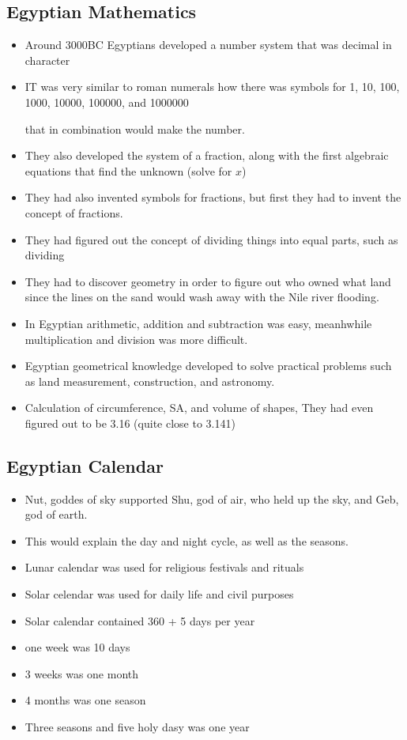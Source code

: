 \documentclass{article}
\begin{document}
\subsection{Egyptian Mathematics}
\begin{itemize}
  \item Around 3000BC Egyptians developed a number system that
    was decimal in character
  \item IT was very similar to roman numerals how there was
    symbols for 1, 10, 100, 1000, 10000, 100000, and 1000000

    that in combination would make the number.
  \item They also developed the system of a fraction,
    along with the first algebraic equations that
    find the unknown (solve for $x$)
  \item They had also invented symbols for fractions,
    but first they had to invent the concept of fractions.
  \item They had figured out the concept of dividing
    things into equal parts, such as dividing
  \item They had to discover geometry in order
    to figure out who owned what land since the lines on the
    sand would wash away with the Nile river flooding.
  \item In Egyptian arithmetic, addition and subtraction was easy, meanhwhile
    multiplication and division was more difficult.
  \item Egyptian geometrical knowledge developed to solve practical problems
    such as land measurement, construction, and astronomy.
  \item Calculation of circumference, SA, and volume of shapes,
    They had even figured out \pi{} to be 3.16 (quite close to 3.141)
\end{itemize}

\subsection{Egyptian Calendar}
\begin{itemize}
  \item Nut, goddes of sky supported Shu, god of air,
    who held up the sky, and Geb, god of earth.
  \item This would explain the day and night cycle, as well as the seasons.
  \item Lunar calendar was used for religious festivals and rituals
  \item Solar celendar was used for daily life and civil purposes
  \item Solar calendar contained 360 + 5 days per year
  \item one week was 10 days
  \item 3 weeks was one month
  \item 4 months was one season
  \item Three seasons and five holy dasy was one year
\end{itemize}
\end{document}
